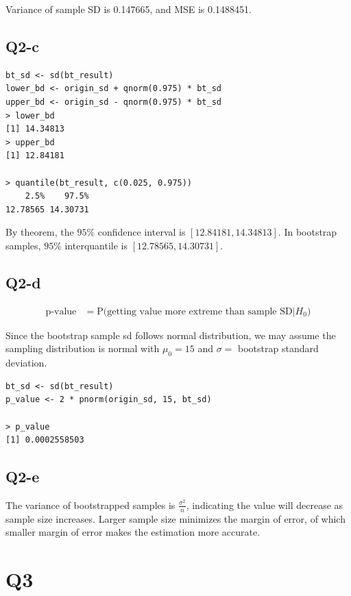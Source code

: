 \documentclass[12pt,letterpaper]{article}
\begin{document}
\noindent Variance of sample SD is 0.147665, and MSE is 0.1488451. 

\subsection*{Q2-c}
\begin{verbatim}
bt_sd <- sd(bt_result)
lower_bd <- origin_sd + qnorm(0.975) * bt_sd
upper_bd <- origin_sd - qnorm(0.975) * bt_sd
> lower_bd
[1] 14.34813
> upper_bd
[1] 12.84181

> quantile(bt_result, c(0.025, 0.975))
    2.5%    97.5% 
12.78565 14.30731 
\end{verbatim}

\noindent By theorem, the $95\%$ confidence interval is $[12.84181, 14.34813]$. In bootstrap samples, $95\%$ interquantile is $[12.78565, 14.30731 ]$.

\subsection*{Q2-d}

\begin{align*}
\text{p-value} &= \text{P(getting value more extreme than sample SD} | H_0)
\end{align*}

\noindent Since the bootstrap sample sd follows normal distribution, we may assume the sampling distribution is normal with $\mu_0 = 15$ and $\sigma = $ bootstrap standard deviation. 

\begin{verbatim}
bt_sd <- sd(bt_result)
p_value <- 2 * pnorm(origin_sd, 15, bt_sd)

> p_value
[1] 0.0002558503
\end{verbatim}

\subsection*{Q2-e}
\noindent The variance of bootstrapped samples is $\frac{\sigma^2}{n}$, indicating the value will decrease as sample size increases. Larger sample size
minimizes the margin of error, of which smaller margin of error makes the estimation more accurate. 

\section*{Q3}
\end{document}
